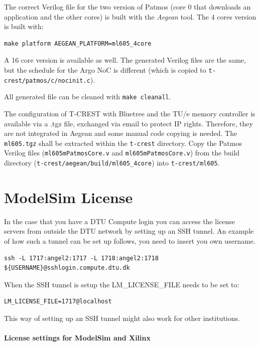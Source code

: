 \documentclass[a4paper,fontsize=10pt,twoside,DIV15,BCOR12mm,headinclude=true,footinclude=false,pagesize,bibtotoc]{scrbook}
\newcommand{\code}[1]{{\texttt{#1}}}
\begin{document}
The correct Verilog file for the two version of Patmos (core 0 that downloads an application and the other cores)
is built with the \emph{Aegean} tool. The 4 cores version is built with:

\begin{verbatim}
make platform AEGEAN_PLATFORM=ml605_4core
\end{verbatim}


A 16 core version is available as well. The generated Verilog files are the same,
but the schedule for the Argo NoC is different (which is copied to
\code{t-crest/patmos/c/nocinit.c}).

All generated file can be cleaned with \code{make cleanall}.

The configuration of T-CREST with Bluetree and the TU/e memory controller
is available via a .tgz file, exchanged via email to protect IP rights.
Therefore, they are not integrated in Aegean and some manual code copying is needed.
The \code{ml605.tgz} shall be extracted within the \code{t-crest} directory.
Copy the Patmos Verilog files (\code{ml605mPatmosCore.v} and \code{ml605mPatmosCore.v})
from the build directory (\code{t-crest/aegean/build/ml605\_4core}) into \code{t-crest/ml605}.



\section{ModelSim License}
In the case that you have a DTU Compute login you can access the license servers from outside the DTU network by setting up an SSH tunnel.
An example of how such a tunnel can be set up follows, you need to insert you own username.

\begin{verbatim}
ssh -L 1717:angel2:1717 -L 1718:angel2:1718 ${USERNAME}@sshlogin.compute.dtu.dk
\end{verbatim}

When the SSH tunnel is setup the LM\_LICENSE\_FILE needs to be set to:
\begin{verbatim}
LM_LICENSE_FILE=1717@localhost
\end{verbatim}

This way of setting up an SSH tunnel might also work for other institutions.

\paragraph{License settings for ModelSim and Xilinx}
\end{document}
